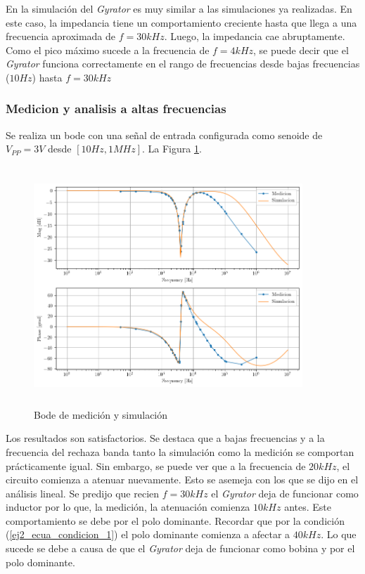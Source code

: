 \documentclass[12pt,a4paper]{article}
\begin{document}
En la simulación del \textit{Gyrator} es muy similar a las simulaciones ya realizadas. En este caso, la impedancia tiene un comportamiento creciente hasta que llega a una frecuencia aproximada de $f = 30 kHz$. Luego, la impedancia cae abruptamente. Como el pico máximo sucede a la frecuencia de $f=4kHz$, se puede decir que el \textit{Gyrator} funciona correctamente en el rango de frecuencias desde bajas frecuencias ($10Hz$) hasta $f = 30kHz$

\subsubsection{Medicion y analisis a altas frecuencias}

Se realiza un bode con una señal de entrada configurada como senoide de $V_{PP} = 3V$ desde $[10Hz , 1MHz]$. La Figura \ref{fig:ej2_hp_med_and_sim}.

\begin{figure}[h!]                                                    
\centering\includegraphics[width=0.9\textwidth, height=9cm]{Resources/ej2_br_med_and_sim.png}
\caption{Bode de medición y simulación}
\label{fig:ej2_hp_med_and_sim}
\end{figure}

Los resultados son satisfactorios. Se destaca que a bajas frecuencias y a la frecuencia del rechaza banda tanto la simulación como la medición se comportan prácticamente igual. Sin embargo, se puede ver que a la frecuencia de $20kHz$, el circuito comienza a atenuar nuevamente. Esto se asemeja con los que se dijo en el análisis lineal. Se predijo que recien $f = 30kHz$ el \textit{Gyrator} deja de funcionar como inductor por lo que, la medición, la atenuación comienza $10kHz$ antes. Este comportamiento se debe por el polo dominante. Recordar que por la condición (\ref{ej2_ecua_condicion_1}) el polo dominante comienza a afectar a $40 kHz$. Lo que sucede se debe a causa de que el \textit{Gyrator} deja de funcionar como bobina y por el polo dominante.  
\end{document}
